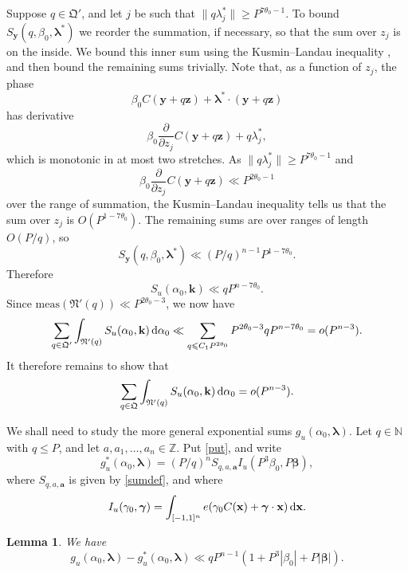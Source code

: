 \documentclass[12pt,reqno]{amsart}
\newtheorem{lemma}[thm]{Lemma}
\theoremstyle{definition}
\theoremstyle{remark}
\numberwithin{equation}{section}
\begin{document}
Suppose $q \in {\mathfrak Q}'$, and let $j$ be such that $\| q {{\lambda}}^*_j \| {\geqslant} P^{7 {{\theta}}_0 - 1}$. To bound $S_{\mathbf y}(q,{{\beta}}_0,{{\boldsymbol {{\lambda}}}}^*)$ we reorder the summation, if necessary, so that the sum over $z_j$ is on the inside. We bound this inner sum using the Kusmin--Landau inequality \cite[Theorem 2.1]{GK1991}, and then bound the remaining sums trivially. Note that, as a function of $z_j$, the phase
\[
{{\beta}}_0 C({\mathbf y} + q {\mathbf z}) + {{\boldsymbol {{\lambda}}}}^* \cdot ({\mathbf y} + q {\mathbf z})
\]
has derivative 
\[
{{\beta}}_0  \frac \partial {\partial z_j} C({\mathbf y} + q {\mathbf z}) +  q {{\lambda}}_j^*,
\]
which is monotonic in at most two stretches. As $\| q {{\lambda}}^*_j \| {\geqslant} P^{7 {{\theta}}_0 - 1}$ and
\[
{{\beta}}_0  \frac \partial {\partial z_j} C({\mathbf y} + q {\mathbf z}) \ll  P^{2 {{\theta}}_0 - 1}
\]
over the range of summation, the Kusmin--Landau inequality tells us that the sum over $z_j$ is $O(P^{1-7{{\theta}}_0})$. The remaining sums are over ranges of length $O(P/q)$, so
\[
S_{\mathbf y}(q, {{\beta}}_0, {{\boldsymbol {{\lambda}}}}^*) \ll (P/q)^{n-1} P^{1-7{{\theta}}_0}.
\]
Therefore
\[
S_u({{\alpha}}_0,{\mathbf k}) \ll qP^{n-7{{\theta}}_0}.
\]
Since ${\mathrm{meas}}({\mathfrak N}'(q)) \ll P^{2 {{\theta}}_0 - 3}$, we now have
\[
\sum_{q \in {\mathfrak Q}'} \int_{{\mathfrak N}'(q)} S_u({{\alpha}}_0,{\mathbf k}) {{\,{\rm d}}} {{\alpha}}_0 \ll \sum_{q {\leqslant} C_1P^{2 {{\theta}}_0}} P^{2{{\theta}}_0-3} qP^{n-7{{\theta}}_0}
= o(P^{n-3}).
\]
It therefore remains to show that
\[
\sum_{q \in {\mathfrak Q}} \int_{{\mathfrak N}'(q)} S_u({{\alpha}}_0, {\mathbf k}) {{\,{\rm d}}} {{\alpha}}_0 = o(P^{n-3}).
\]

We shall need to study the more general exponential sums $g_u({{\alpha}}_0,{{\boldsymbol {{\lambda}}}})$. Let $q \in {\mathbb N}$ with $q {\leqslant} P$, and let $a, a_1, \ldots, a_n \in {\mathbb Z}$. Put \eqref{put}, and write
\[
g_u^*({{\alpha}}_0, {{\boldsymbol {{\lambda}}}}) = (P/q)^n S_{q,a,{\mathbf a}} I_u(P^3 {{\beta}}_0, P {\boldsymbol{\beta}}),
\]
where $S_{q,a,{\mathbf a}}$ is given by \eqref{sumdef}, and where
\[
I_u({{\gamma}}_0, {\boldsymbol{{\gamma}}}) = \int_{[-1,1]^n} e({{\gamma}}_0 C({\mathbf x}) + {\boldsymbol{{\gamma}}} \cdot {\mathbf x}) {{\,{\rm d}}} {\mathbf x}.
\]

\begin{lemma} We have
\begin{equation} \label{ggstar}
g_u({{\alpha}}_0,{{\boldsymbol {{\lambda}}}}) - g_u^*({{\alpha}}_0,{{\boldsymbol {{\lambda}}}}) \ll qP^{n-1} (1+P^3|{{\beta}}_0| + P|{\boldsymbol{\beta}}|).
\end{equation}
\end{lemma}
\end{document}
